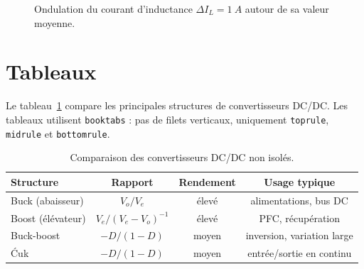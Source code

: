 \begin{figure}[htbp]
\centering
{}
\caption{Ondulation du courant d'inductance $\Delta I_L = \SI{1}{A}$
  autour de sa valeur moyenne.}
\label{fig:ondulation_courant}
\end{figure}

\section{Tableaux}

Le tableau~\ref{tab:convertisseurs_cc} compare les principales
structures de convertisseurs DC/DC. Les tableaux utilisent
\texttt{booktabs} : pas de filets verticaux, uniquement
\texttt{toprule}, \texttt{midrule} et \texttt{bottomrule}.

\begin{table}[htbp]
\centering
\caption{Comparaison des convertisseurs DC/DC non isolés.}
\label{tab:convertisseurs_cc}
\small
\begin{tabular}{lccc}
\toprule
\textcolor{accenthesso}{\textbf{Structure}} &
\textcolor{accenthesso}{\textbf{Rapport}} &
\textcolor{accenthesso}{\textbf{Rendement}} &
\textcolor{accenthesso}{\textbf{Usage typique}} \\
\midrule
Buck (abaisseur)   & $V_o / V_e$           & élevé & alimentations, bus DC \\
Boost (élévateur)   & $V_e / (V_e - V_o)^{-1}$ & élevé & PFC, récupération \\
Buck-boost          & $-D/(1-D)$           & moyen & inversion, variation large \\
\'Cuk               & $-D/(1-D)$           & moyen & entrée/sortie en continu \\
\bottomrule
\end{tabular}
\end{table}

